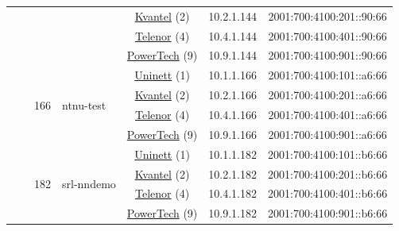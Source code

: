 \begin{small}
\begin{center}
\begin{longtable}{|c|c|c|c|c|c|c|c|}
  &  &  &  & \multicolumn{2}{|c|}{\tiny{\href{http://kvantel.no}{Kvantel} (2)}} & \tiny{10.2.1.144} & \tiny{2001:700:4100:201::90:66} \\* \cline{5-5}\cline{6-6}\cline{7-7}\cline{8-8}
  &  &  &  & \multicolumn{2}{|c|}{\tiny{\href{https://www.telenor.no}{Telenor} (4)}} & \tiny{10.4.1.144} & \tiny{2001:700:4100:401::90:66} \\* \cline{5-5}\cline{6-6}\cline{7-7}\cline{8-8}
  &  &  &  & \multicolumn{2}{|c|}{\tiny{\href{http://www.powertech.no}{PowerTech} (9)}} & \tiny{10.9.1.144} & \tiny{2001:700:4100:901::90:66} \\* \cline{3-3}\cline{4-4}\cline{5-5}\cline{6-6}\cline{7-7}\cline{8-8}
  &  & \multirow{4}{*}{\tiny{166}} & \multicolumn{1}{|l|}{\multirow{4}{*}{\tiny{ntnu-test}}} & \multicolumn{2}{|c|}{\tiny{\href{https://www.uninett.no}{Uninett} (1)}} & \tiny{10.1.1.166} & \tiny{2001:700:4100:101::a6:66} \\* \cline{5-5}\cline{6-6}\cline{7-7}\cline{8-8}
  &  &  &  & \multicolumn{2}{|c|}{\tiny{\href{http://kvantel.no}{Kvantel} (2)}} & \tiny{10.2.1.166} & \tiny{2001:700:4100:201::a6:66} \\* \cline{5-5}\cline{6-6}\cline{7-7}\cline{8-8}
  &  &  &  & \multicolumn{2}{|c|}{\tiny{\href{https://www.telenor.no}{Telenor} (4)}} & \tiny{10.4.1.166} & \tiny{2001:700:4100:401::a6:66} \\* \cline{5-5}\cline{6-6}\cline{7-7}\cline{8-8}
  &  &  &  & \multicolumn{2}{|c|}{\tiny{\href{http://www.powertech.no}{PowerTech} (9)}} & \tiny{10.9.1.166} & \tiny{2001:700:4100:901::a6:66} \\* \cline{3-3}\cline{4-4}\cline{5-5}\cline{6-6}\cline{7-7}\cline{8-8}
  &  & \multirow{4}{*}{\tiny{182}} & \multicolumn{1}{|l|}{\multirow{4}{*}{\tiny{srl-nndemo}}} & \multicolumn{2}{|c|}{\tiny{\href{https://www.uninett.no}{Uninett} (1)}} & \tiny{10.1.1.182} & \tiny{2001:700:4100:101::b6:66} \\* \cline{5-5}\cline{6-6}\cline{7-7}\cline{8-8}
  &  &  &  & \multicolumn{2}{|c|}{\tiny{\href{http://kvantel.no}{Kvantel} (2)}} & \tiny{10.2.1.182} & \tiny{2001:700:4100:201::b6:66} \\* \cline{5-5}\cline{6-6}\cline{7-7}\cline{8-8}
  &  &  &  & \multicolumn{2}{|c|}{\tiny{\href{https://www.telenor.no}{Telenor} (4)}} & \tiny{10.4.1.182} & \tiny{2001:700:4100:401::b6:66} \\* \cline{5-5}\cline{6-6}\cline{7-7}\cline{8-8}
  &  &  &  & \multicolumn{2}{|c|}{\tiny{\href{http://www.powertech.no}{PowerTech} (9)}} & \tiny{10.9.1.182} & \tiny{2001:700:4100:901::b6:66} \\ \hline

\end{longtable}
\end{center}
\end{small}
